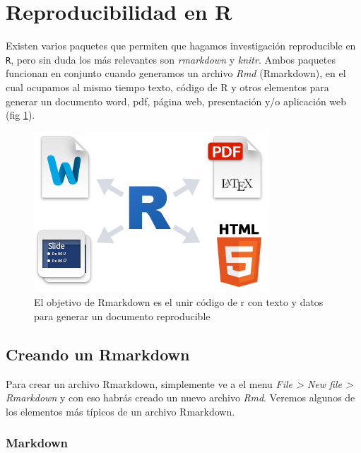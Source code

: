 \documentclass[]{book}
\begin{document}
\hypertarget{reproducibilidad-en-r}{%
\section{Reproducibilidad en R}\label{reproducibilidad-en-r}}

Existen varios paquetes que permiten que hagamos investigación
reproducible en \texttt{R}, pero sin duda los más relevantes son
\emph{rmarkdown} y \emph{knitr}. Ambos paquetes funcionan en conjunto
cuando generamos un archivo \emph{Rmd} (Rmarkdown), en el cual ocupamos
al mismo tiempo texto, código de R y otros elementos para generar un
documento word, pdf, página web, presentación y/o aplicación web (fig
\ref{fig:Rmark}).

\begin{figure}

{\centering \includegraphics[width=0.8\linewidth]{Rmark} 

}

\caption{El objetivo de Rmarkdown es el unir código de r con texto y datos para generar un documento reproducible}\label{fig:Rmark}
\end{figure}

\hypertarget{creando-un-rmarkdown}{%
\subsection{Creando un Rmarkdown}\label{creando-un-rmarkdown}}

Para crear un archivo Rmarkdown, simplemente ve a el menu \emph{File
\textgreater{} New file \textgreater{} Rmarkdown} y con eso habrás
creado un nuevo archivo \emph{Rmd}. Veremos algunos de los elementos más
típicos de un archivo Rmarkdown.

\hypertarget{markdown}{%
\subsubsection{Markdown}\label{markdown}}
\end{document}
